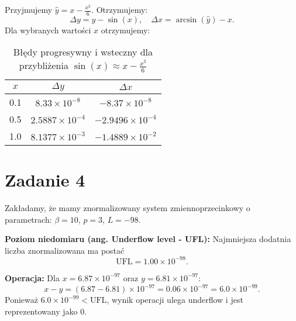 \documentclass{article}
\begin{document}
Przyjmujemy $\hat{y} = x - \frac{x^3}{6}$. Otrzymujemy:
\begin{equation}
    \Delta y = \hat{y} - \sin(x), \quad \Delta x = \arcsin(\hat{y}) - x.
\end{equation}
Dla wybranych wartości $x$ otrzymujemy:

\begin{table}[H]
    \centering
    \begin{tabular}{c|cc}
         $x$ & $\Delta y$ & $\Delta x$ \\
         \hline
         0.1 & $8.33\times10^{-8}$ & $-8.37\times10^{-8}$ \\
         0.5 & $2.5887\times10^{-4}$ & $-2.9496\times10^{-4}$ \\
         1.0 & $8.1377\times10^{-3}$ & $-1.4889\times10^{-2}$ \\
    \end{tabular}
    \caption{Błędy progresywny i wsteczny dla przybliżenia $\sin(x)\approx x - \frac{x^3}{6}$}
    \label{tab:two_term}
\end{table}

\section{Zadanie 4}

Zakładamy, że mamy znormalizowany system zmiennoprzecinkowy o parametrach: $\beta=10$, $p=3$, $L=-98$.

\textbf{Poziom niedomiaru (ang. Underflow level - UFL):} 
Najmniejsza dodatnia liczba znormalizowana ma postać
\[
\text{UFL} = 1.00 \times 10^{-98}.
\]

\textbf{Operacja:} Dla $x = 6.87\times10^{-97}$ oraz $y = 6.81\times10^{-97}$:
\[
x - y = (6.87-6.81)\times10^{-97} = 0.06\times10^{-97} = 6.0\times10^{-99}.
\]
Ponieważ $6.0\times10^{-99} < \text{UFL}$, wynik operacji ulega underflow i jest reprezentowany jako $0$.
\end{document}
